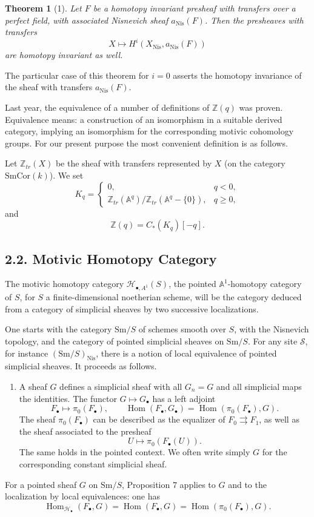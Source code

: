 \documentclass[11pt]{article}
\newcommand{\Aone}{\mathbb A^1}
\newcommand{\A}{\mathbb A}
\newcommand{\Z}{\mathbb Z}
\newcommand{\Nis}{\mathrm{Nis}}
\newcommand{\Sm}{\mathrm{Sm}}
\newcommand{\SmCor}{\mathrm{SmCor}}
\newcommand{\Hom}{\operatorname{Hom}}
\newcommand{\Hob}{\mathcal H_\bullet}
\newcommand{\HoA}{\mathcal H_{\bullet,A^1}}
\theoremstyle{deligne}
\newtheorem*{theorem*}{Theorem}
\begin{document}
\begin{theorem*}[1]
Let \(F\) be a homotopy invariant presheaf with transfers over a perfect field, with associated Nisnevich sheaf \(a_{\Nis}(F)\). Then the presheaves with transfers
\[
  X\longmapsto H^i(X_{\Nis},a_{\Nis}(F))
\]
are homotopy invariant as well.
\end{theorem*}

The particular case of this theorem for \(i=0\) asserts the homotopy invariance of the sheaf with transfers \(a_{\Nis}(F)\).

Last year, the equivalence of a number of definitions of \(\Z(q)\) was proven. Equivalence means: a construction of an isomorphism in a suitable derived category, implying an isomorphism for the corresponding motivic cohomology groups. For our present purpose the most convenient definition is as follows.

Let \(\Z_{tr}(X)\) be the sheaf with transfers represented by \(X\) (on the category \(\SmCor(k)\)). We set
\[
K_q=\begin{cases}
0,& q<0,\\
\Z_{tr}(\A^q)/\Z_{tr}(\A^q-\{0\}),& q\ge0,
\end{cases}
\]
and
\[
  \Z(q)=C_*(K_q)[-q].
\]

\subsection*{2.2. Motivic Homotopy Category}

The motivic homotopy category \(\HoA(S)\), the pointed \(\Aone\)-homotopy category of \(S\), for \(S\) a finite-dimensional noetherian scheme, will be the category deduced from a category of simplicial sheaves by two successive localizations.

One starts with the category \(\Sm/S\) of schemes smooth over \(S\), with the Nisnevich topology, and the category of pointed simplicial sheaves on \(\Sm/S\). For any site \(\mathcal S\), for instance \((\Sm/S)_{\Nis}\), there is a notion of local equivalence of pointed simplicial sheaves. It proceeds as follows.
\begin{enumerate}[label=(\alph*)]
\item A sheaf \(G\) defines a simplicial sheaf with all \(G_n=G\) and all simplicial maps the identities. The functor \(G\mapsto G_\bullet\) has a left adjoint
\[
  F_\bullet\longmapsto \pi_0(F_\bullet),
\qquad
  \Hom(F_\bullet,G_\bullet)=\Hom(\pi_0(F_\bullet),G).
\]
The sheaf \(\pi_0(F_\bullet)\) can be described as the equalizer of \(F_0\rightrightarrows F_1\), as well as the sheaf associated to the presheaf
\[
  U\longmapsto \pi_0(F_\bullet(U)).
\]
The same holds in the pointed context. We often write simply \(G\) for the corresponding constant simplicial sheaf.
\end{enumerate}
For a pointed sheaf \(G\) on \(\Sm/S\), Proposition 7 applies to \(G\) and to the localization by local equivalences: one has
\[
  \Hom_{\Hob}(F_\bullet,G)=\Hom(F_\bullet,G)=\Hom(\pi_0(F_\bullet),G). \tag{0.1}
\]
\end{document}
